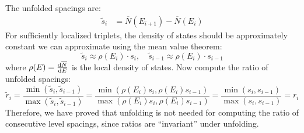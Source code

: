 \documentclass[10pt]{article}
\begin{document}
The unfolded spacings are:
%
\begin{align}
\tilde{s}_i 
&= 
\overline{N}(E_{i+1}) - \overline{N}(E_i) 
%
\end{align}
%
%
For sufficiently localized triplets, the density of states should be 
approximately constant we can approximate using the mean 
value theorem:
%
\begin{equation}
\tilde{s}_i \approx \rho(E_i) \cdot s_i, \quad 
\tilde{s}_{i-1} \approx \rho(E_i) \cdot s_{i-1}
\end{equation}
%
where $\rho(E) = \dv{\overline{N}}{E}$ is the local density of states.
Now compute the ratio of unfolded spacings:
%
\begin{equation}
\tilde{r}_i = \frac{\min(\tilde{s}_i, \tilde{s}_{i-1})}
{\max(\tilde{s}_i, \tilde{s}_{i-1})}
= \frac{\min(\rho(E_i)s_i, \rho(E_i)s_{i-1})}
{\max(\rho(E_i)s_i, \rho(E_i)s_{i-1})}
= \frac{\min(s_i, s_{i-1})}{\max(s_i, s_{i-1})} 
= r_i
\end{equation}
%
Therefore, we have proved that unfolding is not needed for computing the 
ratio of consecutive level spacings, since ratios are ``invariant'' under 
unfolding.
\end{document}
